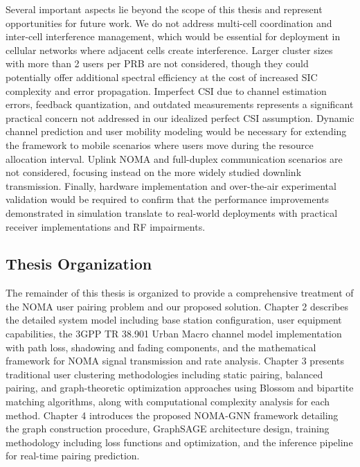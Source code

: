Several important aspects lie beyond the scope of this thesis and represent opportunities for future work. We do not address multi-cell coordination and inter-cell interference management, which would be essential for deployment in cellular networks where adjacent cells create interference. Larger cluster sizes with more than 2 users per PRB are not considered, though they could potentially offer additional spectral efficiency at the cost of increased SIC complexity and error propagation. Imperfect CSI due to channel estimation errors, feedback quantization, and outdated measurements represents a significant practical concern not addressed in our idealized perfect CSI assumption. Dynamic channel prediction and user mobility modeling would be necessary for extending the framework to mobile scenarios where users move during the resource allocation interval. Uplink NOMA and full-duplex communication scenarios are not considered, focusing instead on the more widely studied downlink transmission. Finally, hardware implementation and over-the-air experimental validation would be required to confirm that the performance improvements demonstrated in simulation translate to real-world deployments with practical receiver implementations and RF impairments.

\subsection{Thesis Organization}

The remainder of this thesis is organized to provide a comprehensive treatment of the NOMA user pairing problem and our proposed solution. Chapter 2 describes the detailed system model including base station configuration, user equipment capabilities, the 3GPP TR 38.901 Urban Macro channel model implementation with path loss, shadowing and fading components, and the mathematical framework for NOMA signal transmission and rate analysis. Chapter 3 presents traditional user clustering methodologies including static pairing, balanced pairing, and graph-theoretic optimization approaches using Blossom and bipartite matching algorithms, along with computational complexity analysis for each method. Chapter 4 introduces the proposed NOMA-GNN framework detailing the graph construction procedure, GraphSAGE architecture design, training methodology including loss functions and optimization, and the inference pipeline for real-time pairing prediction.

